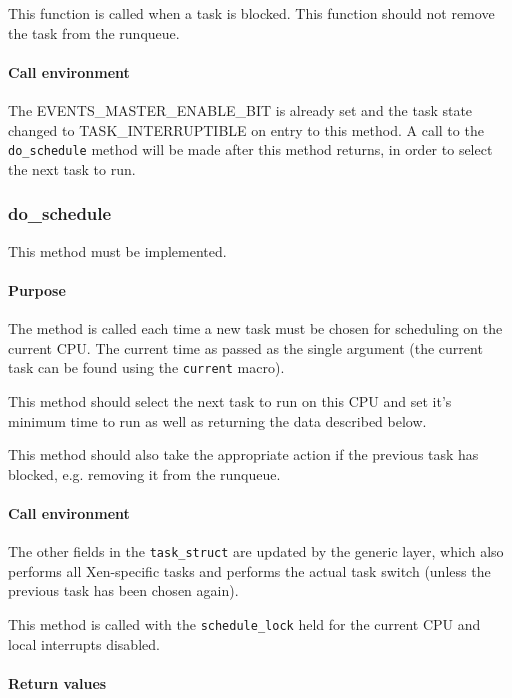 \documentclass[11pt,twoside,final,openright]{xenstyle}
\begin{document}
This function is called when a task is blocked.  This function should
not remove the task from the runqueue.

\paragraph*{Call environment}

The EVENTS\_MASTER\_ENABLE\_BIT is already set and the task state changed to
TASK\_INTERRUPTIBLE on entry to this method.  A call to the {\tt
  do\_schedule} method will be made after this method returns, in
order to select the next task to run.

\subsubsection{do\_schedule}

This method must be implemented.

\paragraph*{Purpose}

The method is called each time a new task must be chosen for scheduling on the
current CPU.  The current time as passed as the single argument (the current
task can be found using the {\tt current} macro).

This method should select the next task to run on this CPU and set it's minimum
time to run as well as returning the data described below.

This method should also take the appropriate action if the previous
task has blocked, e.g. removing it from the runqueue.

\paragraph*{Call environment}

The other fields in the {\tt task\_struct} are updated by the generic layer,
which also performs all Xen-specific tasks and performs the actual task switch
(unless the previous task has been chosen again).

This method is called with the {\tt schedule\_lock} held for the current CPU
and local interrupts disabled.

\paragraph*{Return values}
\end{document}
